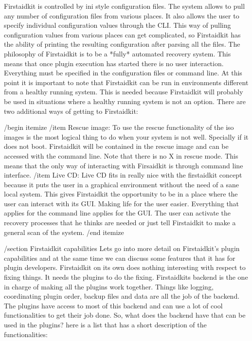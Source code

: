 Firstaidkit is controlled by ini style configuration files.  The system allows to pull any number of configuration files from various places.  It also allows the user to specify individual configuration values through the CLI.  This way of pulling configuration values from various places can get complicated, so Firstaidkit has the ability of printing the resulting configuration after parsing all the files.
The philosophy of Firstaidkit is to be a *fully* automated recovery system.  This means that once plugin execution has started there is no user interaction.  Everything must be specified in the configuration files or command line.
At this point it is important to note that Firstaidkit can be run in environments different from a healthy running system.  This is needed because Firstaidkit will probably be used in situations where a healthy running system is not an option.  There are two additional ways of getting to Firstaidkit:

/begin{ itemize }
/item Rescue image:
To use the rescue functionality of the iso images is the most logical thing to do when your system is not well.  Specially if it does not boot.  Firstaidkit will be contained in the rescue image and can be accessed with the command line.  Note that there is no X in rescue mode.  This means that the only way of interacting with Firsaidkit is through command line interface.
/item Live CD:
Live CD fits in really nice with the firstaidkit concept because it puts the user in a graphical environment without the need of a sane local system.  This gives Firstaidkit the opportunity to be in a place where the user can interact with its GUI.  Making life for the user easier.  Everything that applies for the command line applies for the GUI.  The user can activate the recovery processes that he thinks are needed or just tell Firstaidkit to make a general scan of the system.
/end { itemize }

/section{ Firstaidkit capabilities }
Lets go into more detail on Firstaidkit's plugin capabilities and at the same time we can discuss some features that it has for plugin developers.  Firstaidkit on its own does nothing interesting with respect to fixing things.  It needs the plugins to do the fixing.  Firstaidkits backend is the one in charge of making all the plugins work together.  Things like logging, coordinating plugin order, backup files and data are all the job of the backend.  The plugins have access to most of this backend and can use a lot of cool functionalities to get their job done.  So, what does the backend have that can be used in the plugins?  here is a list that has a short description of the functionalities:

